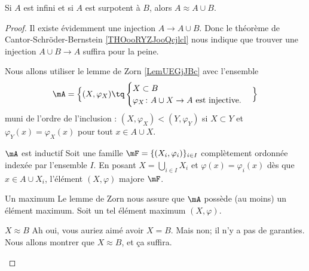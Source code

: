 \begin{lemma}       \label{LEMooXMVDooIWLWis}
    Si \( A\) est infini et si \( A\) est surpotent à \( B\), alors \( A\approx A\cup B\).
\end{lemma}

\begin{proof}
    Il existe évidemment une injection \( A\to A\cup B\). Donc le théorème de Cantor-Schröder-Bernstein \ref{THOooRYZJooQcjlcl} nous indique que trouver une injection \( A\cup B\to A\) suffira pour la peine.

    Nous allons utiliser le lemme de Zorn \ref{LemUEGjJBc} avec l'ensemble
    \begin{equation}
       \mA=\Big\{  (X,\varphi_X)  \tq
        \begin{cases}
            X\subset B\\
            \varphi_X\colon A\cup X\to A\text{ est injective.}
        \end{cases}
    \Big\}
    \end{equation}
    muni de l'ordre de l'inclusion : \( (X,\varphi_X)<(Y,\varphi_Y)\) si \( X\subset Y\) et \( \varphi_Y(x)=\varphi_X(x)\) pour tout \( x\in A\cup X\).
    
    \begin{subproof}
        \item[\( \mA\) est inductif]
            Soit une famille \( \mF=\{ (X_i,\varphi_i) \}_{i\in I}\) complètement ordonnée indexée par l'ensemble \( I\). En posant \( X=\bigcup_{i\in I}X_i\) et \( \varphi(x)=\varphi_i(x)\) dès que \( x\in A\cup X_i\), l'élément \( (X,\varphi)\) majore \( \mF\).
        \item[Un maximum]
            Le lemme de Zorn nous assure que \( \mA\) possède (au moins) un élément maximum. Soit un tel élément maximum \( (X,\varphi)\). 
        \item[\( X\approx B\)]
            Ah oui, vous auriez aimé avoir \( X=B\). Mais non; il n'y a pas de garanties. Nous allons montrer que \( X\approx B\), et ça suffira.


\end{subproof}
\end{proof}
